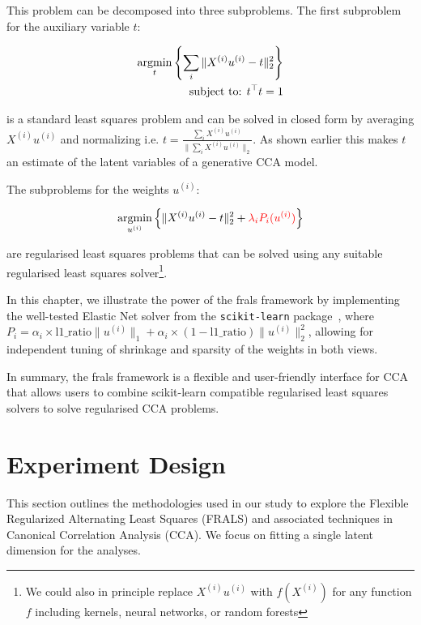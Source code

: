 This problem can be decomposed into three subproblems.
The first subproblem for the auxiliary variable \(t\):

\begin{align}
    \underset{t}{\mathrm{argmin}}\left\{\sum_i \|X^{(i)} u^{(i)} - t\|_2^2\right\}\\
    \text{subject to: }t^\top t = 1 \notag
\end{align}

is a standard least squares problem and can be solved in closed form by averaging \(X^{(i)} u^{(i)}\) and normalizing i.e. \(t = \frac{\sum_i X^{(i)} u^{(i)}}{\|\sum_i X^{(i)} u^{(i)}\|_2}\).
As shown earlier this makes \(t\) an estimate of the latent variables of a generative CCA model.

The subproblems for the weights \(u^{(i)}\):

\begin{align}
    \underset{u^{(i)}}{\mathrm{argmin}}\left\{\|X^{(i)} u^{(i)} - t\|_2^2 + \textcolor{red}{\lambda_i P_i(u^{(i)})} \right\}
\end{align}

are regularised least squares problems that can be solved using any suitable regularised least squares solver\footnote{We could also in principle replace $X^{(i)} u^{(i)}$ with $f(X^{(i)})$ for any function $f$ including kernels, neural networks, or random forests}.

In this chapter, we illustrate the power of the \acrshort{frals} framework by implementing the well-tested Elastic Net solver from the \texttt{scikit-learn} package~\citep{pedregosa2011scikit}, where \(P_i = \alpha_i \times \text{l1\_ratio} \|u^{(i)}\|_1 + \alpha_i \times (1-\text{l1\_ratio}) \|u^{(i)}\|_2^2\), allowing for independent tuning of shrinkage and sparsity of the weights in both views.

In summary, the \acrshort{frals} framework is a flexible and user-friendly interface for CCA that allows users to combine scikit-learn compatible regularised least squares solvers to solve regularised CCA problems.

\section{Experiment Design}

This section outlines the methodologies used in our study to explore the Flexible Regularized Alternating Least Squares (FRALS) and associated techniques in Canonical Correlation Analysis (CCA). We focus on fitting a single latent dimension for the analyses.

